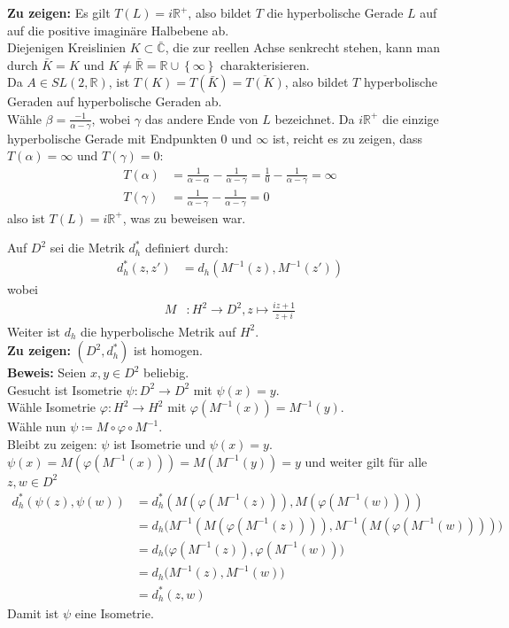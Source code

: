 \begin{problem*}[3b]
\textbf{Zu zeigen: } Es gilt $T(L) = i \mathbb{R}^{ + }$, also bildet $T $ die hyperbolische Gerade $L$ auf auf die positive imaginäre Halbebene ab.\\
Diejenigen Kreislinien $K \subset \bar{\mathbb{C}}$, die zur reellen Achse senkrecht stehen, kann man durch $ \bar{K} = K$ und $K \neq \bar{\mathbb{R}} = \mathbb{R} \cup \left\{ \infty \right\}$ charakterisieren.\\
Da $A \in SL(2, \mathbb{R})$, ist $T(K) = T(\bar{K}) = \overline{ T(K) }$, also bildet $ T $ hyperbolische Geraden auf hyperbolische Geraden ab. \\
Wähle $\beta = \frac{-1}{\alpha - \gamma}$, wobei $ \gamma $ das andere Ende von $ L $ bezeichnet. Da $ i \mathbb{R}^{ + }$ die einzige hyperbolische Gerade mit Endpunkten $ 0 $ und $ \infty $ ist, reicht es zu zeigen, dass $T(\alpha) = \infty $ und $T(\gamma) = 0$:\\
\begin{align*}
T( \alpha) &= \frac{1}{\alpha - \alpha} - \frac{1}{\alpha - \gamma} = \frac{1}{0} - \frac{1}{\alpha - \gamma} = \infty \\
T(\gamma) &= \frac{1}{\alpha - \gamma} - \frac{1}{\alpha - \gamma} = 0 
\end{align*}
also ist $T(L) = i \mathbb{R}^{ + }$, was zu beweisen war.
\end{problem*}
\begin{problem*}[4]
Auf $D^2$ sei die Metrik $d_h^\ast$ definiert durch:
\begin{align*}
  d_h^\ast (z, z') &= d_h(M^{-1}(z),M^{-1}(z')) 
\end{align*}
wobei
\begin{align*}  
  M &: H^2 \to D^2, z \mapsto \frac{iz + 1}{z + i}
\end{align*}
Weiter ist $d_h$ die hyperbolische Metrik auf $H^2$.\\
\textbf{Zu zeigen: } $(D^2, d_h^\ast)$ ist homogen. \\
\textbf{Beweis: } Seien $x,y \in D^2$ beliebig.\\
Gesucht ist Isometrie $\psi: D^2 \to D^2$ mit $\psi(x) = y $.\\
Wähle Isometrie $\varphi: H^2 \to H^2 $ mit $ \varphi(M^{-1}(x)) = M^{-1}(y)$. \\
Wähle nun $\psi \coloneqq M \circ \varphi \circ M^{-1}$. \\
Bleibt zu zeigen: $ \psi $ ist Isometrie und $\psi(x) = y$.\\
$\psi(x) = M(\varphi(M^{-1}(x))) = M(M^{-1}(y)) = y$ und weiter gilt für alle $z, w \in D^2$
\begin{align*}
d_h^\ast(\psi(z), \psi(w)) &= d_h^\ast (M(\varphi(M^{-1}(z))), M(\varphi(M^{-1}(w)))) \\
&= d_h \big(M^{ -1 }(M(\varphi(M^{-1}(z)))), M^{ -1 }(M(\varphi(M^{-1}(w))))\big) \\
&= d_h \big(\varphi(M^{-1}(z)), \varphi(M^{-1}(w))\big) \\
&= d_h \big(M^{ -1 }(z), M^{ -1 }(w)) \\
&= d_h^\ast (z, w)
\end{align*}
Damit ist $\psi$ eine Isometrie.
\end{problem*}
